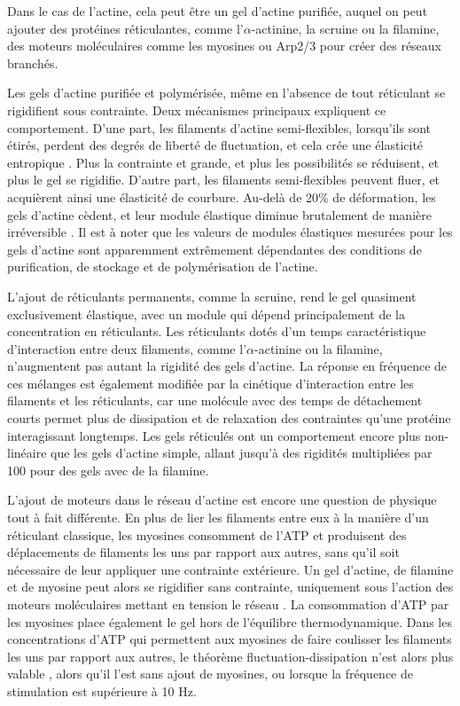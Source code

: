 Dans le cas de l'actine, cela peut être un gel d'actine purifiée, auquel on peut ajouter des protéines réticulantes, comme l'$\alpha$-actinine, la scruine ou la filamine, des moteurs moléculaires comme les myosines ou Arp2/3 pour créer des réseaux branchés. 

Les gels d'actine purifiée et polymérisée, même en l'absence de tout réticulant se rigidifient sous contrainte. Deux mécanismes principaux expliquent ce comportement. 
D'une part, les filaments d'actine semi-flexibles, lorsqu'ils sont étirés, perdent des degrés de liberté de fluctuation, et cela crée une élasticité entropique \cite{storm_2005}. Plus la contrainte et grande, et plus les possibilités se réduisent, et plus le gel se rigidifie. 
D'autre part, les filaments semi-flexibles peuvent fluer, et acquièrent ainsi une élasticité de courbure. 
Au-delà de 20\% de déformation, les gels d'actine cèdent, et leur module élastique diminue brutalement de manière irréversible \cite{janmey_1994}.
Il est à noter que les valeurs de modules élastiques mesurées pour les gels d'actine sont apparemment extrêmement dépendantes des conditions de purification, de stockage et de polymérisation de l'actine. 

L'ajout de réticulants permanents, comme la scruine, rend le gel quasiment exclusivement élastique, avec un module qui dépend principalement de la concentration en réticulants. 
Les réticulants dotés d'un temps caractéristique d'interaction entre deux filaments, comme l'$\alpha$-actinine ou la filamine, n'augmentent pas autant la rigidité des gels d'actine. 
La réponse en fréquence de ces mélanges est également modifiée par la cinétique d'interaction entre les filaments et les réticulants, car une molécule avec des temps de détachement courts permet plus de dissipation et de relaxation des contraintes qu'une protéine interagissant longtemps. 
Les gels réticulés ont un comportement encore plus non-linéaire que les gels d'actine simple, allant jusqu'à des rigidités multipliées par 100 pour des gels avec de la filamine. 

L'ajout de moteurs dans le réseau d'actine est encore une question de physique tout à fait différente. En plus de lier les filaments entre eux à la manière d'un réticulant classique, les myosines consomment de l'ATP et produisent des déplacements de filaments les uns par rapport aux autres, sans qu'il soit nécessaire de leur appliquer une contrainte extérieure. 
Un gel d'actine, de filamine et de myosine peut alors se rigidifier sans contrainte, uniquement sous l'action des moteurs moléculaires mettant en tension le réseau \cite{koenderink}. 
La consommation d'ATP par les myosines place également le gel hors de l'équilibre thermodynamique. Dans les concentrations d'ATP qui permettent aux myosines de faire coulisser les filaments les uns par rapport aux autres, le théorème fluctuation-dissipation n'est alors plus valable \cite{mizuno}, alors qu'il l'est sans ajout de myosines, ou lorsque la fréquence de stimulation est supérieure à 10 Hz. 



